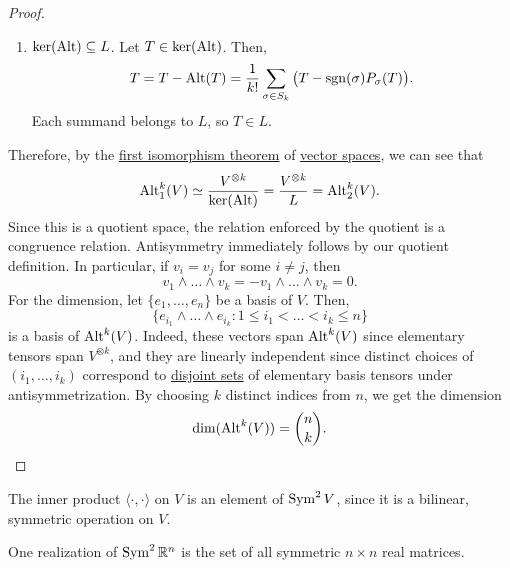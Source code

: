 \begin{proof}
\begin{enumerate}
\begin{enumerate}
					\item $\ker(\operatorname{Alt}) \subseteq L$. Let $T \in \ker(\operatorname{Alt})$. Then,
						\begin{equation}
							T = T - \operatorname{Alt}(T) = \frac{1}{k!}\sum_{\sigma \in S_k}
							\big(T - \operatorname{sgn}(\sigma)P_\sigma(T)\big).
						\end{equation}
						Each summand belongs to $L$, so $T \in L$.
				\end{enumerate}
		\end{enumerate}
		Therefore, by the \hyperref[thm:first-isomorphism-theorem]{first isomorphism theorem} of \hyperref[def:vector-space]{vector spaces}, we can see that
		\begin{equation}
			\operatorname{Alt}^k_1(V) \simeq \frac{V^{\otimes k}}{\ker(\operatorname{Alt})}
			= \frac{V^{\otimes k}}{L} = \operatorname{Alt}^k_2(V).
		\end{equation}
		Since this is a quotient space, the relation enforced by the quotient is a congruence relation. Antisymmetry immediately follows by our quotient definition. In particular, if $v_i = v_j$ for some $i \neq j$, then
		\begin{equation}
			v_1 \wedge \ldots \wedge v_k
			= -v_1 \wedge \ldots \wedge v_k = 0.
		\end{equation}
		For the dimension, let $\{e_1,\ldots,e_n\}$ be a basis of $V$. Then,
		\begin{equation}
			\big\{e_{i_1} \wedge \ldots \wedge e_{i_k}
			\colon 1 \leq i_1 < \ldots < i_k \leq n\big\}
		\end{equation}
		is a basis of $\operatorname{Alt}^k(V)$. Indeed, these vectors span $\operatorname{Alt}^k(V)$ since elementary tensors span $V^{\otimes k}$, and they are linearly independent since distinct choices of $(i_1,\ldots,i_k)$ correspond to \hyperref[st-def:disjoint-sets]{disjoint sets} of elementary basis tensors under antisymmetrization. By choosing $k$ distinct indices from $n$, we get the dimension
		\begin{equation}
			\dim(\operatorname{Alt}^k(V)) = \binom{n}{k}.
		\end{equation}
	\end{proof}

	\begin{example}
	  \label{ex:inner-product-2}
    The inner product $\langle \cdot, \cdot \rangle$ on $V$ is an element of $\operatorname{Sym}^2 V$, since it is a bilinear, symmetric operation on $V$. 
  \end{example}

	\begin{example}
	  \label{ex:sym2v-is-symmetric-matrices}
		One realization of $\operatorname{Sym}^2 \mathbb{R}^n$ is the set of all symmetric $n \times n$ real matrices. 
	\end{example}

